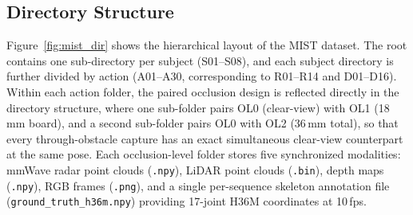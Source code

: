\documentclass{article}
\begin{document}
\begin{table}[h]
  \centering
  \caption{MIST complete action list.}
  \label{tab:mist_actions}
  \small
  \setlength{\tabcolsep}{4pt}
\end{table}

\subsection{Directory Structure}

Figure~\ref{fig:mist_dir} shows the hierarchical layout of the MIST dataset.
The root contains one sub-directory per subject (S01--S08), and each subject
directory is further divided by action (A01--A30, corresponding to R01--R14 and
D01--D16).
Within each action folder, the paired occlusion design is reflected directly in
the directory structure, where one sub-folder pairs OL0 (clear-view) with OL1
(18\,mm board), and a second sub-folder pairs OL0 with OL2 (36\,mm total),
so that every through-obstacle capture has an exact simultaneous clear-view
counterpart at the same pose.
Each occlusion-level folder stores five synchronized modalities: mmWave radar
point clouds (\texttt{.npy}), LiDAR point clouds (\texttt{.bin}), depth maps
(\texttt{.npy}), RGB frames (\texttt{.png}), and a single per-sequence skeleton
annotation file (\texttt{ground\_truth\_h36m.npy}) providing 17-joint H36M
coordinates at 10\,fps.
\end{document}
